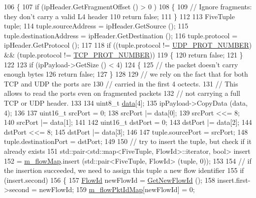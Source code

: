 \begin{DoxyCode}
106 \{
107   \textcolor{keywordflow}{if} (ipHeader.GetFragmentOffset () > 0 )
108     \{
109       \textcolor{comment}{// Ignore fragments: they don't carry a valid L4 header}
110       \textcolor{keywordflow}{return} \textcolor{keyword}{false};
111     \}
112 
113   FiveTuple tuple;
114   tuple.sourceAddress = ipHeader.GetSource ();
115   tuple.destinationAddress = ipHeader.GetDestination ();
116   tuple.protocol = ipHeader.GetProtocol ();
117 
118   \textcolor{keywordflow}{if} ((tuple.protocol != \hyperlink{namespacens3_ae787098cbb0a3e8f6a17d9249e88a77f}{UDP\_PROT\_NUMBER}) && (tuple.protocol != 
      \hyperlink{namespacens3_a203a34fc0e042720ce1a0a754e270646}{TCP\_PROT\_NUMBER}))
119     \{
120       \textcolor{keywordflow}{return} \textcolor{keyword}{false};
121     \}
122 
123   \textcolor{keywordflow}{if} (ipPayload->GetSize () < 4)
124     \{
125       \textcolor{comment}{// the packet doesn't carry enough bytes}
126       \textcolor{keywordflow}{return} \textcolor{keyword}{false};
127     \}
128 
129   \textcolor{comment}{// we rely on the fact that for both TCP and UDP the ports are}
130   \textcolor{comment}{// carried in the first 4 octects.}
131   \textcolor{comment}{// This allows to read the ports even on fragmented packets}
132   \textcolor{comment}{// not carrying a full TCP or UDP header.}
133 
134   uint8\_t \hyperlink{topology-example-sim_8cc_a26c65296e316af77b787dc77469bb2a4}{data}[4];
135   ipPayload->CopyData (data, 4);
136 
137   uint16\_t srcPort = 0;
138   srcPort |= data[0];
139   srcPort <<= 8;
140   srcPort |= data[1];
141 
142   uint16\_t dstPort = 0;
143   dstPort |= data[2];
144   dstPort <<= 8;
145   dstPort |= data[3];
146 
147   tuple.sourcePort = srcPort;
148   tuple.destinationPort = dstPort;
149 
150   \textcolor{comment}{// try to insert the tuple, but check if it already exists}
151   std::pair<std::map<FiveTuple, FlowId>::iterator, \textcolor{keywordtype}{bool}> insert
152     = \hyperlink{classns3_1_1Ipv4FlowClassifier_abd62b87d946068783f98976126e131b6}{m\_flowMap}.insert (std::pair<FiveTuple, FlowId> (tuple, 0));
153 
154   \textcolor{comment}{// if the insertion succeeded, we need to assign this tuple a new flow identifier}
155   \textcolor{keywordflow}{if} (insert.second)
156     \{
157       \hyperlink{group__flow-monitor_ga39a766c4a370cdb9ab8ac85da4b288e9}{FlowId} newFlowId = \hyperlink{classns3_1_1FlowClassifier_a5469e94282efde8b8212e20995c6cccd}{GetNewFlowId} ();
158       insert.first->second = newFlowId;
159       \hyperlink{classns3_1_1Ipv4FlowClassifier_a330e21b9b9926ab76ff354aa8ce8e2be}{m\_flowPktIdMap}[newFlowId] = 0;

\end{DoxyCode}
